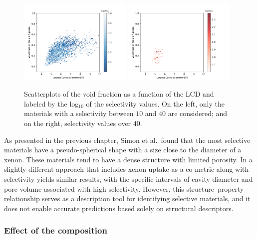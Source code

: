 \documentclass[main.tex]{subfiles}
\begin{document}
\begin{figure}[ht!]
  \centering
  \includegraphics[width=0.48\textwidth]{figures/2-thermo/Scatterplot_vf_lcd_selectivity.pdf}
  \includegraphics[width=0.48\textwidth]{figures/2-thermo/Scatterplot_vf_lcd_selectivity_zoom.pdf}  
  \caption{Scatterplots of the void fraction as a function of the LCD and labeled by the log$_{10}$ of the selectivity values. On the left, only the materials with a selectivity between $10$ and $40$ are considered; and on the right, selectivity values over $40$.}\label{fgr:lcd_vf}
\end{figure}


As presented in the previous chapter, Simon et al.\ found that the most selective materials have a pseudo-spherical shape with a size close to the diameter of a xenon. These materials tend to have a dense structure with limited porosity. In a slightly different approach that includes xenon uptake as a co-metric along with selectivity yields similar results, with the specific intervals of cavity diameter and pore volume associated with high selectivity. However, this structure--property relationship serves as a description tool for identifying selective materials, and it does not enable accurate predictions based solely on structural descriptors. 

\subsubsection{Effect of the composition}
\end{document}
